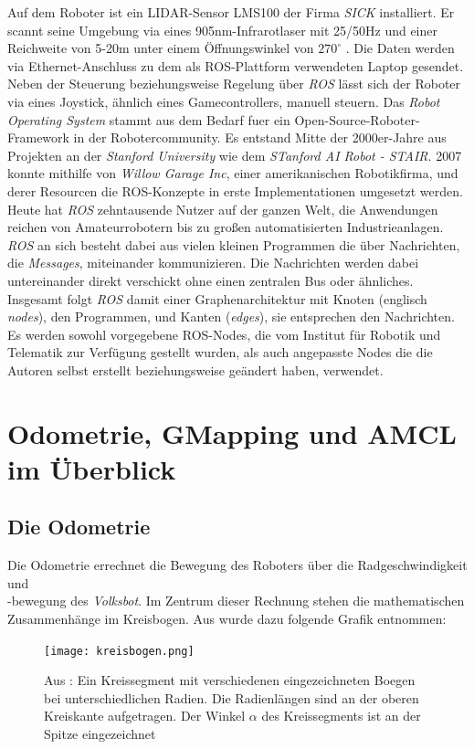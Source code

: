 \documentclass[11pt,a4paper]{article}
\begin{document}
Auf dem Roboter ist ein LIDAR-Sensor LMS100 der Firma \textit{SICK} installiert. Er scannt seine Umgebung via eines 905nm-Infrarotlaser 
mit 25/50Hz und einer Reichweite von 5-20m unter einem Öffnungswinkel von $270^\circ$ \cite{website:LMS100}. Die Daten werden via Ethernet-Anschluss zu dem als ROS-Plattform verwendeten
Laptop gesendet. Neben der Steuerung beziehungsweise Regelung über \textit{ROS} lässt sich der Roboter via eines Joystick, ähnlich eines Gamecontrollers, manuell steuern.
Das \textit{Robot Operating System}  stammt aus dem Bedarf fuer ein Open-Source-Roboter-Framework in der Robotercommunity.
Es entstand Mitte der 2000er-Jahre aus Projekten an der \textit{Stanford University} wie dem \textit{STanford AI Robot - STAIR}.
2007 konnte mithilfe von \textit{Willow Garage Inc}, einer amerikanischen Robotikfirma, und derer
Resourcen die ROS-Konzepte in erste Implementationen umgesetzt werden. Heute hat \textit{ROS} zehntausende Nutzer auf der ganzen Welt,
die Anwendungen reichen von Amateurrobotern bis zu großen automatisierten Industrieanlagen. 
\textit{ROS} an sich besteht dabei aus vielen kleinen Programmen die über Nachrichten, die \textit{Messages}, miteinander kommunizieren.
Die Nachrichten werden dabei untereinander direkt verschickt ohne einen zentralen Bus oder ähnliches. Insgesamt
folgt \textit{ROS} damit einer Graphenarchitektur mit Knoten (englisch \textit{nodes}), den Programmen, und Kanten (\textit{edges}), sie entsprechen den Nachrichten. \cite{quigley2015programming}
Es werden sowohl vorgegebene ROS-Nodes, die vom Institut für Robotik und Telematik zur Verfügung gestellt wurden, als auch angepasste Nodes die die Autoren selbst erstellt beziehungsweise
geändert haben, verwendet. 
\section{Odometrie, GMapping und AMCL im Überblick}
\subsection*{Die Odometrie}
Die Odometrie errechnet die Bewegung des Roboters über die Radgeschwindigkeit und \\ -bewegung 
des \textit{Volksbot}. Im Zentrum dieser Rechnung stehen die mathematischen Zusammenhänge im Kreisbogen. 
Aus \cite{website:dresden} wurde dazu folgende Grafik entnommen:

\begin{figure}[ht]
  \centering
  \texttt{[image: kreisbogen.png]}
  \caption{Aus \cite{website:dresden}: Ein Kreissegment mit verschiedenen eingezeichneten Boegen bei unterschiedlichen Radien. Die Radienlängen sind an der oberen Kreiskante 
  aufgetragen. Der Winkel $\alpha$ des Kreissegments ist an der Spitze eingezeichnet}
  \label{fig: Kreissegment}
\end{figure}
\end{document}
